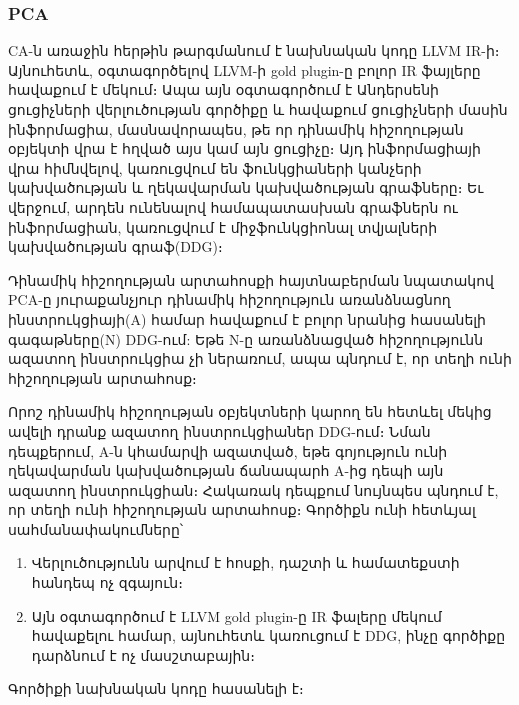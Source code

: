 \subsubsection{PCA}
CA\cite{Li2020}-ն առաջին հերթին թարգմանում է նախնական կոդը LLVM IR-ի։ Այնուհետև, օգտագործելով LLVM-ի gold plugin-ը
բոլոր IR ֆայլերը հավաքում է մեկում։ Ապա այն օգտագործում է Անդերսենի ցուցիչների վերլուծության գործիքը\cite{Andersen}
և հավաքում ցուցիչների մասին ինֆորմացիա, մասնավորապես, թե որ դինամիկ հիշողության օբյեկտի վրա է հղված այս կամ այն ցուցիչը։
Այդ ինֆորմացիայի վրա հիմնվելով, կառուցվում են ֆունկցիաների կանչերի կախվածության և ղեկավարման կախվածության գրաֆները։
Եւ վերջում, արդեն ունենալով համապատասխան գրաֆներն ու ինֆորմացիան, կառուցվում է միջֆունկցիոնալ տվյալների կախվածության գրաֆ(DDG)։

Դինամիկ հիշողության արտահոսքի հայտնաբերման նպատակով PCA-ը յուրաքանչյուր դինամիկ հիշողություն առանձնացնող ինստրուկցիայի(A)
համար հավաքում է բոլոր նրանից հասանելի գագաթները(N) DDG-ում: Եթե N-ը առանձնացված հիշողությունն ազատող ինստրուկցիա
չի ներառում, ապա պնդում է, որ տեղի ունի հիշողության արտահոսք։

Որոշ դինամիկ հիշողության օբյեկտների կարող են հետևել մեկից ավելի դրանք ազատող ինստրուկցիաներ DDG-ում։
Նման դեպքերում, A-ն կհամարվի ազատված, եթե գոյություն ունի ղեկավարման կախվածության ճանապարհ A-ից դեպի այն ազատող
ինստրուկցիան։ Հակառակ դեպքում նույնպես պնդում է, որ տեղի ունի հիշողության արտահոսք։ Գործիքն ունի հետևյալ սահմանափակումները՝
\begin{enumerate}[itemsep=1mm]
    \item Վերլուծությունն արվում է հոսքի, դաշտի և համատեքստի հանդեպ ոչ զգայուն։
    \item Այն օգտագործում է LLVM gold plugin-ը IR ֆալերը մեկում հավաքելու համար, այնուհետև կառուցում է DDG, ինչը գործիքը
    դարձնում է ոչ մասշտաբային։
\end{enumerate}

Գործիքի նախնական կոդը հասանելի է\cite{PCA}։
